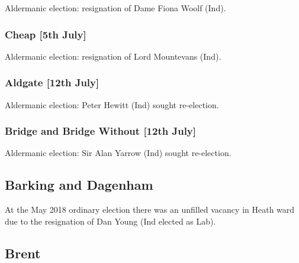 \documentclass[a4paper,openany]{book}
\begin{document}
\begin{resultsiii}

Aldermanic election: resignation of Dame Fiona Woolf (Ind).

\subsubsection*{Cheap \hspace*{\fill}\nolinebreak[1]%
\enspace\hspace*{\fill}
[5th July]}


Aldermanic election: resignation of Lord Mountevans (Ind).

\subsubsection*{Aldgate \hspace*{\fill}\nolinebreak[1]%
\enspace\hspace*{\fill}
[12th July]}


Aldermanic election: Peter Hewitt (Ind) sought re-election.

\subsubsection*{Bridge and Bridge Without \hspace*{\fill}\nolinebreak[1]%
\enspace\hspace*{\fill}
[12th July]}


Aldermanic election: Sir Alan Yarrow (Ind) sought re-election.

\subsection*{Barking and Dagenham}

At the May 2018 ordinary election there was an unfilled vacancy in Heath ward due to the resignation of Dan Young (Ind elected as Lab).

\subsection*{Brent}


\end{resultsiii}
\end{document}
